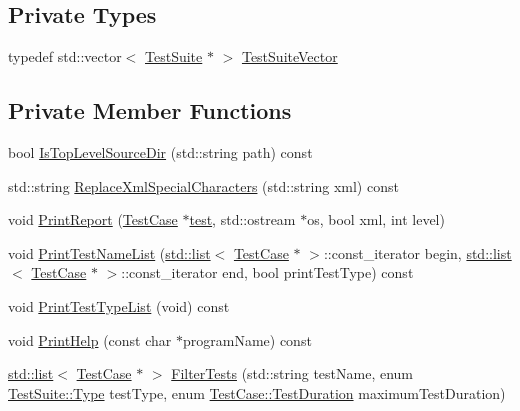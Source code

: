 \subsection*{Private Types}
\begin{DoxyCompactItemize}
\item 
typedef std\+::vector$<$ \hyperlink{classns3_1_1TestSuite}{Test\+Suite} $\ast$ $>$ \hyperlink{classns3_1_1TestRunnerImpl_a80833d3e74ea02fb09c79fa26935b5b7}{Test\+Suite\+Vector}
\end{DoxyCompactItemize}
\subsection*{Private Member Functions}
\begin{DoxyCompactItemize}
\item 
bool \hyperlink{classns3_1_1TestRunnerImpl_a9cea57ad4c56ee0f2100f137d7ebd911}{Is\+Top\+Level\+Source\+Dir} (std\+::string path) const 
\item 
std\+::string \hyperlink{classns3_1_1TestRunnerImpl_a0fb43cfe6d466a412f52d57dd391bbcd}{Replace\+Xml\+Special\+Characters} (std\+::string xml) const 
\item 
void \hyperlink{classns3_1_1TestRunnerImpl_a959b05cdd96f86f4be4490f16186f7c5}{Print\+Report} (\hyperlink{classns3_1_1TestCase}{Test\+Case} $\ast$\hyperlink{main-test-sync_8cc_a708a4c1a4d0c4acc4c447310dd4db27f}{test}, std\+::ostream $\ast$os, bool xml, int level)
\item 
void \hyperlink{classns3_1_1TestRunnerImpl_a9bd9699afbbe1a774e928637621b47c0}{Print\+Test\+Name\+List} (\hyperlink{openflow-interface_8h_afd9bcfa176617760671b67580f536fa7}{std\+::list}$<$ \hyperlink{classns3_1_1TestCase}{Test\+Case} $\ast$ $>$\+::const\+\_\+iterator begin, \hyperlink{openflow-interface_8h_afd9bcfa176617760671b67580f536fa7}{std\+::list}$<$ \hyperlink{classns3_1_1TestCase}{Test\+Case} $\ast$ $>$\+::const\+\_\+iterator end, bool print\+Test\+Type) const 
\item 
void \hyperlink{classns3_1_1TestRunnerImpl_a187a7decf379b368fb8c7453671f9f32}{Print\+Test\+Type\+List} (void) const 
\item 
void \hyperlink{classns3_1_1TestRunnerImpl_a6ebd6ac3d170ea7969f428ed305a49d1}{Print\+Help} (const char $\ast$program\+Name) const 
\item 
\hyperlink{openflow-interface_8h_afd9bcfa176617760671b67580f536fa7}{std\+::list}$<$ \hyperlink{classns3_1_1TestCase}{Test\+Case} $\ast$ $>$ \hyperlink{classns3_1_1TestRunnerImpl_a42560fb0ddfece59837a10913426a87b}{Filter\+Tests} (std\+::string test\+Name, enum \hyperlink{classns3_1_1TestSuite_a1ebfcab34ec8161e085e8e3a1855eae0}{Test\+Suite\+::\+Type} test\+Type, enum \hyperlink{classns3_1_1TestCase_a11f6f57c21a0d32e605d192a89550f91}{Test\+Case\+::\+Test\+Duration} maximum\+Test\+Duration)
\end{DoxyCompactItemize}
